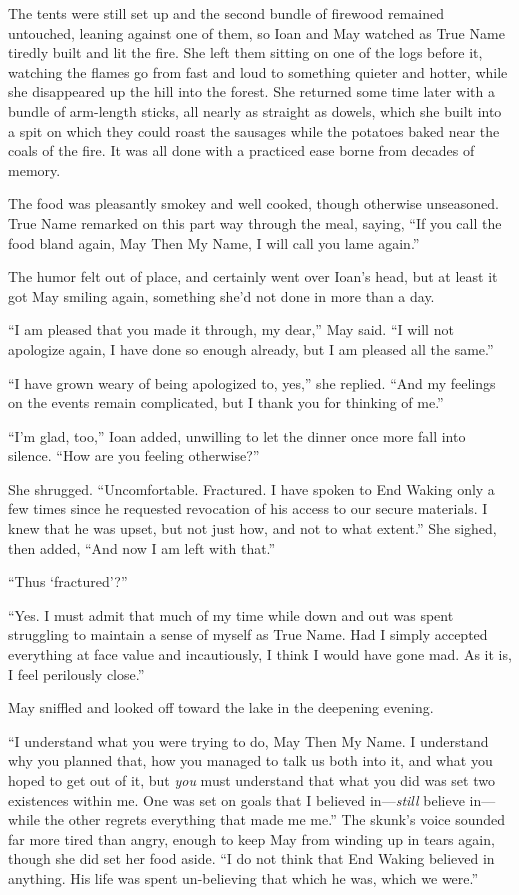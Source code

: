 The tents were still set up and the second bundle of firewood remained untouched, leaning against one of them, so Ioan and May watched as True Name tiredly built and lit the fire. She left them sitting on one of the logs before it, watching the flames go from fast and loud to something quieter and hotter, while she disappeared up the hill into the forest. She returned some time later with a bundle of arm-length sticks, all nearly as straight as dowels, which she built into a spit on which they could roast the sausages while the potatoes baked near the coals of the fire. It was all done with a practiced ease borne from decades of memory.

The food was pleasantly smokey and well cooked, though otherwise unseasoned. True Name remarked on this part way through the meal, saying, ``If you call the food bland again, May Then My Name, I will call you lame again.''

The humor felt out of place, and certainly went over Ioan's head, but at least it got May smiling again, something she'd not done in more than a day.

``I am pleased that you made it through, my dear,'' May said. ``I will not apologize again, I have done so enough already, but I am pleased all the same.''

``I have grown weary of being apologized to, yes,'' she replied. ``And my feelings on the events remain complicated, but I thank you for thinking of me.''

``I'm glad, too,'' Ioan added, unwilling to let the dinner once more fall into silence. ``How are you feeling otherwise?''

She shrugged. ``Uncomfortable. Fractured. I have spoken to End Waking only a few times since he requested revocation of his access to our secure materials. I knew that he was upset, but not just how, and not to what extent.'' She sighed, then added, ``And now I am left with that.''

``Thus `fractured'?''

``Yes. I must admit that much of my time while down and out was spent struggling to maintain a sense of myself as True Name. Had I simply accepted everything at face value and incautiously, I think I would have gone mad. As it is, I feel perilously close.''

May sniffled and looked off toward the lake in the deepening evening.

``I understand what you were trying to do, May Then My Name. I understand why you planned that, how you managed to talk us both into it, and what you hoped to get out of it, but \emph{you} must understand that what you did was set two existences within me. One was set on goals that I believed in—\emph{still} believe in—while the other regrets everything that made me me.'' The skunk's voice sounded far more tired than angry, enough to keep May from winding up in tears again, though she did set her food aside. ``I do not think that End Waking believed in anything. His life was spent un-believing that which he was, which we were.''

